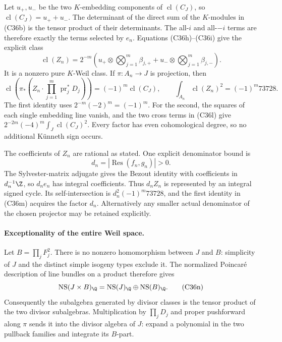Let $u_+,u_-$ be the two $K$-embedding components of
$\operatorname{cl}(C_J)$, so
$\operatorname{cl}(C_J)=u_++u_-$.
The determinant of the direct sum of the $K$-modules
in (C36b) is the tensor product of their determinants.
The all-$i$ and all-$-i$ terms are therefore exactly
the terms selected by $e_n$. Equations (C36h)--(C36i)
give the explicit class
\[
 \operatorname{cl}(Z_n)=2^{-m}
 \left(u_+\otimes\bigotimes_{j=1}^m\beta_{j,+}
       +u_-\otimes\bigotimes_{j=1}^m\beta_{j,-}\right).
 \tag{C36l}
\]
It is a nonzero pure $K$-Weil class. If
$\pi:A_n\to J$ is projection, then
\[
 \operatorname{cl}\left(
   \pi_*\left(Z_n\cdot\prod_{j=1}^m
                         \operatorname{pr}_j^*D_j\right)\right)
          =(-1)^m\operatorname{cl}(C_J),
 \qquad
 \int_{A_n}\operatorname{cl}(Z_n)^2
          =(-1)^m73728.
 \tag{C36m}
\]
The first identity uses $2^{-m}(-2)^m=(-1)^m$.
For the second, the squares of each single embedding
line vanish, and the two cross terms in (C36l) give
$2^{-2m}(-4)^m\int_J\operatorname{cl}(C_J)^2$.
Every factor has even cohomological degree, so no
additional K\"unneth sign occurs.

The coefficients of $Z_n$ are rational as stated.
One explicit denominator bound is
\[
                 d_n=|\operatorname{Res}(f_n,g_n)|>0.
\]
The Sylvester-matrix adjugate gives the Bezout identity
with coefficients in $d_n^{-1}\Z$, so $d_ne_n$ has
integral coefficients. Thus $d_nZ_n$ is represented
by an integral signed cycle. Its self-intersection
is $d_n^2(-1)^m73728$, and the first identity in
(C36m) acquires the factor $d_n$. Alternatively any
smaller actual denominator of the chosen projector
may be retained explicitly.

\paragraph{Exceptionality of the entire Weil space.}
Let $B=\prod_jF_j^2$. There is no nonzero homomorphism
between $J$ and $B$: simplicity of $J$ and the distinct
simple isogeny types exclude it. The normalized
Poincar\'e description of line bundles on a product
therefore gives
\[
             \operatorname{NS}(J\times B)_\Q
              =\operatorname{NS}(J)_\Q
                         \oplus\operatorname{NS}(B)_\Q.
 \tag{C36n}
\]
Consequently the subalgebra generated by divisor classes
is the tensor product of the two divisor subalgebras.
Multiplication by $\prod_jD_j$ and proper pushforward
along $\pi$ sends it into the divisor algebra of $J$:
expand a polynomial in the two pullback families and
integrate its $B$-part.

